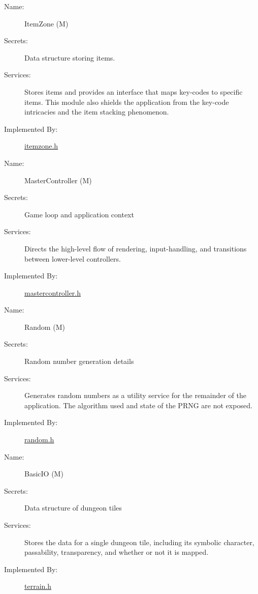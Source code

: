 \documentclass[12pt, titlepage]{article}
\newcounter{mnum}
\newcommand{\mdprint}[1]{\addtocounter{mnum}{1} #1 (M\themnum)}
\begin{document}
        \bigskip\begin{description}
            \item[Name:]\mdprint{ItemZone}
            \item[Secrets:]Data structure storing items.
            \item[Services:]Stores items and provides an interface that maps key-codes to specific items.  This module also shields the application from the key-code intricacies and the item stacking phenomenon. 
            \item[Implemented By:]\href{run:../../../src/include/itemzone.h}{itemzone.h}
        \end{description}

        \bigskip\begin{description}
            \item[Name:]\mdprint{MasterController}
            \item[Secrets:]Game loop and application context
            \item[Services:]Directs the high-level flow of rendering, input-handling, and transitions between lower-level controllers.
            \item[Implemented By:]\href{run:../../../src/include/mastercontroller.h}{mastercontroller.h}
        \end{description}

        \bigskip\begin{description}
            \item[Name:]\mdprint{Random}
            \item[Secrets:]Random number generation details
            \item[Services:]Generates random numbers as a utility service for the remainder of the application.  The algorithm used and state of the PRNG are not exposed.
            \item[Implemented By:]\href{run:../../../src/include/random.h}{random.h}
        \end{description}

        \bigskip\begin{description}
            \item[Name:]\mdprint{BasicIO}
            \item[Secrets:]Data structure of dungeon tiles
            \item[Services:]Stores the data for a single dungeon tile, including its symbolic character, passability, transparency, and whether or not it is mapped.
            \item[Implemented By:]\href{run:../../../src/include/terrain.h}{terrain.h}
        \end{description}
\end{document}
